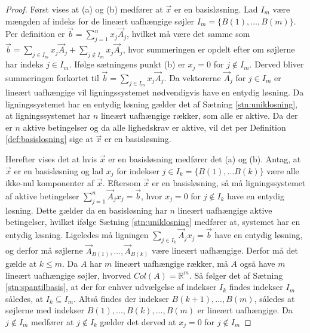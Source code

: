 \begin{proof}
Først vises at (a) og (b) medfører at $\vec{x}$ er en basisløsning.
Lad $I_m$ være mængden af indeks for de lineært uafhængige søjler  $I_m=\{B(1),\dots,B(m)\}$. Per definition er $\vec{b}=\sum_{j=1}^{n} x_j \vec{A}_j$, hvilket må være det samme som $\vec{b}=\sum_{j\in I_m} x_j \vec{A}_j+\sum_{j\notin I_m} x_j \vec{A}_j$, hvor summeringen er opdelt efter om søjlerne har indeks $j \in I_m$. 
Ifølge sætningens punkt (b) er $x_j=0$ for $j \notin I_m$. Derved bliver summeringen forkortet til $\vec{b}=\sum_{j\in I_m}x_j \vec{A}_j$. Da vektorerne $\vec{A}_j$ for $j \in I_m$ er lineært uafhængige vil ligningssystemet nødvendigvis have en entydig løsning. 
Da ligningssystemet har en entydig løsning gælder det af Sætning \ref{stn:uniklosning}, at ligningssystemet har $n$ lineært uafhængige rækker, som alle er aktive. Da der er $n$ aktive betingelser og da alle lighedskrav er aktive, vil det per Definition \ref{def:basislosning} sige at $\vec{x}$ er en basisløsning.

% 

Herefter vises det at hvis $\vec{x}$ er en basisløsning medfører det (a) og (b). Antag, at $\vec{x}$ er en basisløsning og lad $x_j$ for indekser $j \in I_k=\{B(1),\dots B(k)\}$ være alle ikke-nul komponenter af $\vec{x}$.
Eftersom $\vec{x}$ er en basisløsning, så må ligningssystemet af aktive betingelser $\sum_{j=1}^{n}\vec{A}_jx_j=\vec{b}$, hvor $x_j=0$ for $j\notin I_k$ have en entydig løsning. Dette gælder da en basisløsning har $n$ lineært uafhængige aktive betingelser, hvilket ifølge Sætning \ref{stn:uniklosning} medfører at, systemet har en entydig løsning. 
Ligeledes må ligningen $\sum_{j \in I_k}\vec{A}_jx_j=\vec{b}$ have en entydig løsning, og derfor må søjlerne $\vec{A}_{B(1)}, ..., \vec{A}_{B(k)}$ være lineært uafhængige. Derfor må det gælde at $k \leq m$. %
Da $A$ har $m$ lineært uafhængige rækker, må $A$ også have $m$ lineært uafhængige søjler, hvorved $Col(A)=\mathds{R}^m$.
Så følger det af Sætning \ref{stn:spantilbasis}, at der for enhver udvælgelse af indekser $I_k$ findes indekser $I_m$ således, at $I_k \subseteq I_m$. 
Altså findes der indekser $B(k+1),...,B(m)$, således at søjlerne med indekser $B(1),...,B(k),...,B(m)$ er lineært uafhængige. 
Da $j \notin I_m$ medfører at $j \notin I_k$ gælder det derved at $x_j =0$ for $j \notin I_m$



\end{proof}
